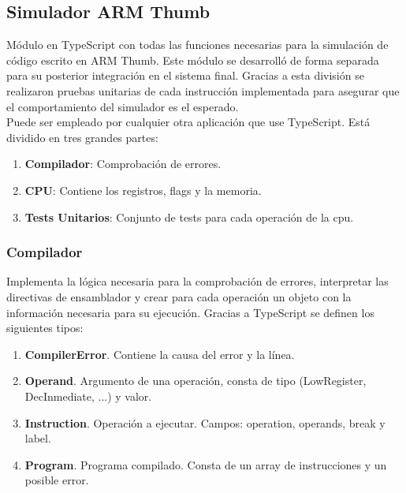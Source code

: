     \subsection{Simulador ARM Thumb}
    {
        Módulo en TypeScript con todas las funciones necesarias para la simulación de código escrito en ARM Thumb.
        Este módulo se desarrolló de forma separada para su posterior integración en el sistema final.
        Gracias a esta división se realizaron pruebas unitarias de cada instrucción implementada
        para asegurar que el comportamiento del simulador es el esperado. \\

        Puede ser empleado por cualquier otra aplicación que use TypeScript. Está dividido en tres grandes partes:
        \begin{enumerate}
            \item \textbf{Compilador}: Comprobación de errores.
            \item \textbf{CPU}: Contiene los registros, flags y la memoria.
            \item \textbf{Tests Unitarios}: Conjunto de tests para cada operación de la cpu.
        \end{enumerate}
    
        
        \subsubsection{Compilador}
        Implementa la lógica necesaria para la comprobación de errores, interpretar las directivas de ensamblador
        y crear para cada operación un objeto con la información necesaria para su ejecución.
        Gracias a TypeScript se definen los siguientes tipos:
        \begin{enumerate}
            \item \textbf{CompilerError}. Contiene la causa del error y la línea.
            \item \textbf{Operand}. Argumento de una operación, consta de tipo (LowRegister, DecInmediate, ...) y valor.
            \item \textbf{Instruction}. Operación a ejecutar. Campos: operation, operands, break y label.
            \item \textbf{Program}. Programa compilado. Consta de un array de instrucciones y un posible error.
        \end{enumerate}

}
